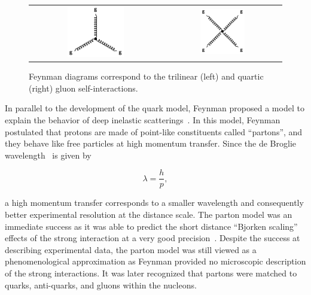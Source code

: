 \begin{figure}[tbh!]
 \begin{center}
 \begin{tabular}{cc}
 \includegraphics[width=0.45\textwidth]{figures/Part1/QCD/QCD3}&
 \includegraphics[width=0.4\textwidth]{figures/Part1/QCD/QCD4}\\
 \end{tabular}
 \caption{Feynman diagrams correspond to the trilinear (left) and quartic (right) gluon self-interactions.}
 \label{fig:gluonself}
 \end{center}
\end{figure}

In parallel to the development of the quark model, Feynman proposed a model to explain the behavior of deep inelastic scatterings~\cite{Feynman:1969wa}. In this model, Feynman postulated that protons are made of point-like constituents called ``partons'', and they behave like free particles at high momentum transfer. Since the de Broglie wavelength~\cite{deBroglie:1924ldk} is given by 

\begin{equation}
\lambda=\frac{h}{p}, 
\end{equation}

a high momentum transfer corresponds to a smaller wavelength and consequently better experimental resolution at the distance scale. The parton model was an immediate success as it was able to predict the short distance ``Bjorken scaling'' effects of the strong interaction at a very good precision~\cite{Bjorken:1969ja}. Despite the success at describing experimental data, the parton model was still viewed as a phenomenological approximation as Feynman provided no microscopic description of the strong interactions. It was later recognized that partons were matched to quarks, anti-quarks, and gluons within the nucleons.

